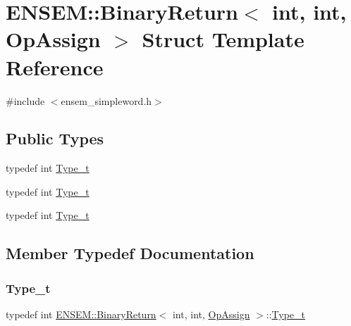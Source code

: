 \hypertarget{structENSEM_1_1BinaryReturn_3_01int_00_01int_00_01OpAssign_01_4}{}\section{E\+N\+S\+EM\+:\+:Binary\+Return$<$ int, int, Op\+Assign $>$ Struct Template Reference}
\label{structENSEM_1_1BinaryReturn_3_01int_00_01int_00_01OpAssign_01_4}


{\ttfamily \#include $<$ensem\+\_\+simpleword.\+h$>$}

\subsection*{Public Types}
\begin{DoxyCompactItemize}
\item 
typedef int \mbox{\hyperlink{structENSEM_1_1BinaryReturn_3_01int_00_01int_00_01OpAssign_01_4_a9190cc9e0398fc2b905dca61a8089bf3}{Type\+\_\+t}}
\item 
typedef int \mbox{\hyperlink{structENSEM_1_1BinaryReturn_3_01int_00_01int_00_01OpAssign_01_4_a9190cc9e0398fc2b905dca61a8089bf3}{Type\+\_\+t}}
\item 
typedef int \mbox{\hyperlink{structENSEM_1_1BinaryReturn_3_01int_00_01int_00_01OpAssign_01_4_a9190cc9e0398fc2b905dca61a8089bf3}{Type\+\_\+t}}
\end{DoxyCompactItemize}


\subsection{Member Typedef Documentation}
\mbox{\label{structENSEM_1_1BinaryReturn_3_01int_00_01int_00_01OpAssign_01_4_a9190cc9e0398fc2b905dca61a8089bf3}} 
\subsubsection{\texorpdfstring{Type\_t}{Type\_t}\hspace{0.1cm}{\footnotesize\ttfamily [1/3]}}
{\footnotesize\ttfamily typedef int \mbox{\hyperlink{structENSEM_1_1BinaryReturn}{E\+N\+S\+E\+M\+::\+Binary\+Return}}$<$ int, int, \mbox{\hyperlink{structENSEM_1_1OpAssign}{Op\+Assign}} $>$\+::\mbox{\hyperlink{structENSEM_1_1BinaryReturn_3_01int_00_01int_00_01OpAssign_01_4_a9190cc9e0398fc2b905dca61a8089bf3}{Type\+\_\+t}}}

